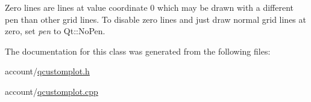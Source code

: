 \-Zero lines are lines at value coordinate 0 which may be drawn with a different pen than other grid lines. \-To disable zero lines and just draw normal grid lines at zero, set {\itshape pen\/} to \-Qt\-::\-No\-Pen. 

\-The documentation for this class was generated from the following files\-:\begin{DoxyCompactItemize}
\item 
account/\hyperlink{qcustomplot_8h}{qcustomplot.\-h}\item 
account/\hyperlink{qcustomplot_8cpp}{qcustomplot.\-cpp}\end{DoxyCompactItemize}
